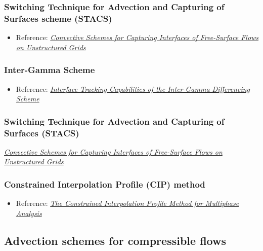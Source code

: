 \subsubsection{Switching Technique for Advection and Capturing of Surfaces scheme (STACS)}

\begin{itemize}
    \item Reference: \textit{\href{http://webfea-lb.fea.aub.edu.lb/cfd/pdfs/publications2/STACS-Complete.pdf}{Convective Schemes for Capturing Interfaces of Free-Surface Flows on Unstructured Grids}}
\end{itemize}

\subsubsection{Inter-Gamma Scheme}

\begin{itemize}
    \item Reference: \textit{\href{http://powerlab.fsb.hr/ped/kturbo/openfoam/docs/InterTrack.pdf}{Interface Tracking Capabilities of the Inter-Gamma Differencing Scheme}}
\end{itemize}

\subsubsection{Switching Technique for Advection and Capturing of Surfaces (STACS)}

\textit{\href{http://webfea-lb.fea.aub.edu.lb/cfd/pdfs/publications2/STACS-Complete.pdf}{Convective Schemes for Capturing Interfaces of Free-Surface Flows on Unstructured Grids}}

\subsubsection{Constrained Interpolation Profile (CIP) method}


\begin{itemize}
    \item Reference: \textit{\href{http://www.mech.titech.ac.jp/~ryuutai/paper/JCP2001CIPReviewYabe.pdf}{The Constrained Interpolation Profile Method for Multiphase Analysis}}
\end{itemize}

\subsection{Advection schemes for compressible flows}

